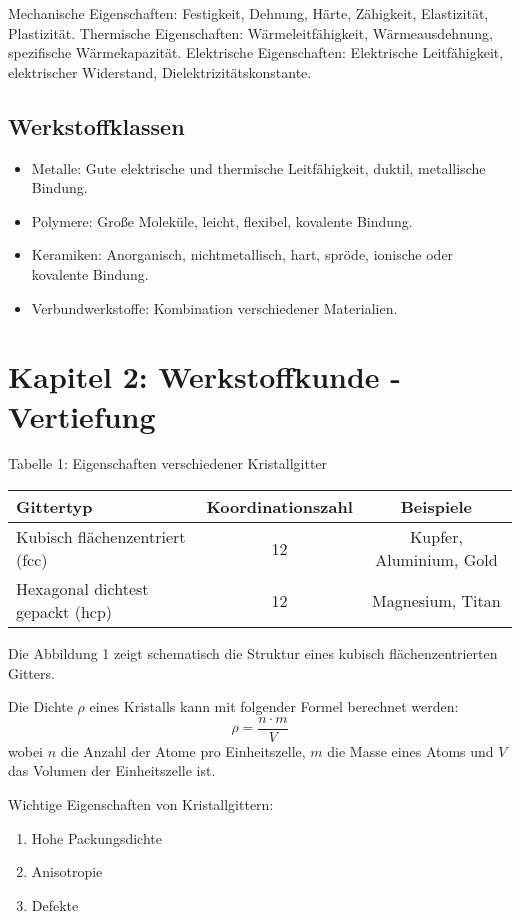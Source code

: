 \documentclass[a4paper,12pt]{article}
\begin{document}
Mechanische Eigenschaften: Festigkeit, Dehnung, Härte, Zähigkeit, Elastizität, Plastizität.
Thermische Eigenschaften: Wärmeleitfähigkeit, Wärmeausdehnung, spezifische Wärmekapazität.
Elektrische Eigenschaften: Elektrische Leitfähigkeit, elektrischer Widerstand, Dielektrizitätskonstante.

\subsection{Werkstoffklassen}
\begin{itemize}
\item Metalle: Gute elektrische und thermische Leitfähigkeit, duktil, metallische Bindung.
\item Polymere: Große Moleküle, leicht, flexibel, kovalente Bindung.
\item Keramiken: Anorganisch, nichtmetallisch, hart, spröde, ionische oder kovalente Bindung.
\item Verbundwerkstoffe: Kombination verschiedener Materialien.
\end{itemize}


\newpage

\section{Kapitel 2: Werkstoffkunde - Vertiefung}

Tabelle 1: Eigenschaften verschiedener Kristallgitter

\begin{tabular}{lcc}
\toprule
Gittertyp & Koordinationszahl & Beispiele \\
\midrule
Kubisch flächenzentriert (fcc) & 12 & Kupfer, Aluminium, Gold \\
Hexagonal dichtest gepackt (hcp) & 12 & Magnesium, Titan \\
\bottomrule
\end{tabular}

Die Abbildung 1 zeigt schematisch die Struktur eines kubisch flächenzentrierten Gitters.


Die Dichte $\rho$ eines Kristalls kann mit folgender Formel berechnet werden:
\begin{equation}
\rho = \frac{n \cdot m}{V}
\end{equation}
wobei $n$ die Anzahl der Atome pro Einheitszelle, $m$ die Masse eines Atoms und $V$ das Volumen der Einheitszelle ist.

Wichtige Eigenschaften von Kristallgittern:
\begin{enumerate}
    \item Hohe Packungsdichte
    \item Anisotropie
    \item Defekte
\end{enumerate}
\end{document}
